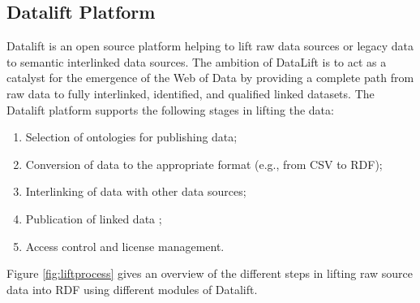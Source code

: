 \subsection{Datalift Platform}
\label{sec:datalift}
Datalift is an open source platform \cite{scharffe_2012} helping to lift raw data sources or legacy data to semantic interlinked data sources.
The ambition of DataLift is to act as a catalyst for the emergence of the Web of Data by providing a complete path from raw data to fully interlinked, identified, and qualified linked datasets. The Datalift platform supports the following stages in lifting the data:
\begin{enumerate}
\item Selection of ontologies for publishing data;
\item Conversion of data to the appropriate format (e.g., from CSV to RDF);
\item Interlinking of data with other data sources;
\item Publication of linked data ;
\item Access control and license management.
\end{enumerate}

Figure \ref{fig:liftprocess} gives an overview of the different steps in lifting raw source data into RDF using different modules of Datalift. 

\begin{figure}[!htp]
\end{figure}


